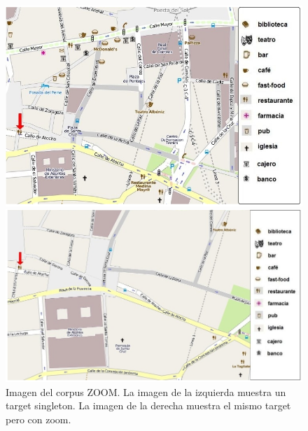 \begin{figure}
\begin{minipage}[b]{0.48\linewidth}
\centering
\includegraphics[width=\textwidth]{images/corpus/mapa7.png}
\caption{}
\label{mapa9}
\end{minipage}
\hspace*{0cm}
\begin{minipage}[b]{0.55\linewidth}
\centering
\includegraphics[width=\textwidth]{images/corpus/mapa17.png}
\caption{}
\label{mapa10}
\end{minipage}
\caption{Imagen del corpus ZOOM. La imagen de la izquierda muestra un target singleton. La imagen de la derecha muestra el mismo target pero con zoom.}
\end{figure}

